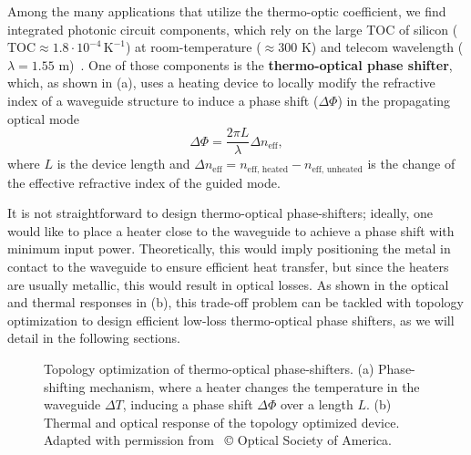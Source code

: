 Among the many applications that utilize the thermo-optic coefficient, we find integrated photonic circuit components, which rely on the large 
TOC of silicon ($\text{TOC} \approx 1.8 \cdot 10^{-4}\, \text{K}^{-1}$) at room-temperature ($\approx300$ K) and telecom wavelength 
($\lambda=1.55$ \textmu m)~\cite{thermo-optic-coef}. One of those components is the \textbf{thermo-optical phase shifter}, which, as shown in  (a),
uses a heating device to locally modify the refractive index of a waveguide structure to induce a phase shift ($\Delta \Phi$) in the propagating optical mode
\begin{equation}\label{eq:phase_shift}
\Delta \Phi = \frac{2\pi L}{\lambda} \Delta n_\text{eff},
\end{equation}
where $L$ is the device length and $\Delta n_\text{eff} = n_\text{eff, heated} - n_\text{eff, unheated}$
 is the change of the effective refractive index of the guided mode. 
 
 It is not straightforward to design thermo-optical phase-shifters; ideally, one would like to place a heater close to the waveguide to achieve a phase shift with minimum input power.
 Theoretically, this would imply positioning the metal in contact to the waveguide to ensure efficient heat transfer, but since the heaters are usually metallic, this would result
 in optical losses. As shown in the optical and thermal responses in  (b), this trade-off problem can be tackled with topology optimization to design efficient low-loss thermo-optical phase shifters, 
 as we will detail in the following sections.

\begin{figure}[tb]
    \centering
    \caption{Topology optimization of thermo-optical phase-shifters. (a) Phase-shifting mechanism, where a heater changes the temperature in the waveguide $\Delta T$, inducing a phase shift
    $\Delta \Phi$ over a length $L$. (b) Thermal and optical response of the topology optimized device. Adapted with permission from~\cite{ownpub0} © Optical Society of America.}
    \label{fig:thermo_res}
\end{figure}



